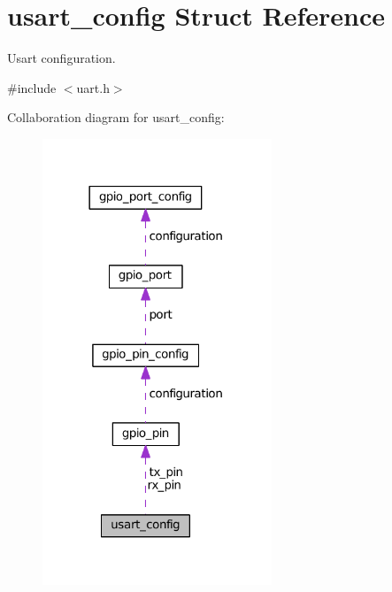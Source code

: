\hypertarget{structusart__config}{}\section{usart\+\_\+config Struct Reference}
\label{structusart__config}


Usart configuration.  




{\ttfamily \#include $<$uart.\+h$>$}



Collaboration diagram for usart\+\_\+config\+:\nopagebreak
\begin{figure}[H]
\begin{center}
\leavevmode
\includegraphics[width=194pt]{structusart__config__coll__graph}
\end{center}
\end{figure}
